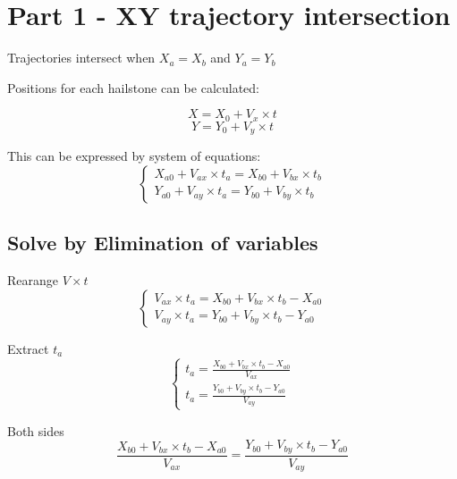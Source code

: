 \documentclass{article}
\begin{document}
\section{Part 1 - XY trajectory intersection}

Trajectories intersect when $X_a = X_b$ and $Y_a = Y_b$

Positions for each hailstone can be calculated:

\begin{displaymath}
    X = X_0 + V_x \times t
\end{displaymath}
\begin{displaymath}
    Y = Y_0 + V_y \times t
\end{displaymath}


This can be expressed by system of equations:
\begin{equation} \label{eq:1}
    \begin{cases}
    X_{a0} + V_{ax} \times t_a = X_{b0} + V_{bx} \times t_b \\
    Y_{a0} + V_{ay} \times t_a = Y_{b0} + V_{by} \times t_b
    \end{cases}
\end{equation}

\subsection{Solve by Elimination of variables}

Rearange $V \times t$
\begin{displaymath}
    \begin{cases}
    V_{ax} \times t_a = X_{b0} + V_{bx} \times t_b - X_{a0} \\
    V_{ay} \times t_a = Y_{b0} + V_{by} \times t_b - Y_{a0}
    \end{cases}
\end{displaymath}

Extract $t_a$
\begin{displaymath}
    \begin{cases}
    t_a = \frac{X_{b0} + V_{bx} \times t_b - X_{a0}}{V_{ax}} \\
    t_a = \frac{Y_{b0} + V_{by} \times t_b - Y_{a0}}{V_{ay}}
    \end{cases}
\end{displaymath}

Both sides
\begin{displaymath}
    \frac{X_{b0} + V_{bx} \times t_b - X_{a0}}{V_{ax}} = \frac{Y_{b0} + V_{by} \times t_b - Y_{a0}}{V_{ay}}
\end{displaymath}
\end{document}
